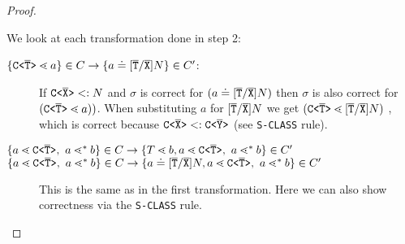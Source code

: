 \begin{proof}
\begin{description}
We look at each transformation done in step 2:
\begin{description}
\item[$\{ \mathtt{C \texttt{<} \overline{\tt T} \texttt{>} } \lessdot a \} \in C \to \{ a \doteq [\overline{\tt T}/\overline{\tt X}]N \} \in C'$:]
If $\mathtt{C \texttt{<} \overline{\tt X} \texttt{>} } <: N$ and $\sigma$ is correct for $(a \doteq [\overline{\tt T}/\overline{\tt X}]N)$
then $\sigma$ is also correct for $(\mathtt{C \texttt{<} \overline{\tt T} \texttt{>} } \lessdot a))$.
When substituting $a$ for $[\overline{\tt T}/\overline{\tt X}]N$ we get 
$(\mathtt{C \texttt{<} \overline{\tt T} \texttt{>} } \lessdot [\overline{\tt T}/\overline{\tt X}]N)$
, which is correct because $\mathtt{C \texttt{<} \overline{\tt X} \texttt{>} } <: \mathtt{C \texttt{<} \overline{\tt Y} \texttt{>} }$
(see \texttt{S-CLASS} rule).
\item[$\{ a \lessdot \mathtt{C \texttt{<} \overline{T} \texttt{>} },\ a \lessdot^* b \} \in C \to \{ T \lessdot b, a \lessdot \mathtt{C \texttt{<} \overline{T} \texttt{>} },\ a \lessdot^* b \} \in C'$]
\item[$\{ a \lessdot \mathtt{C \texttt{<} \overline{T} \texttt{>} },\ a \lessdot^* b \} \in C \to \{ a \doteq [\overline{\tt T}/\overline{\tt X}]N, a \lessdot \mathtt{C \texttt{<} \overline{T} \texttt{>} },\ a \lessdot^* b \} \in C'$]
This is the same as in the first transformation.
Here we can also show correctness via the \texttt{S-CLASS} rule.

\end{description}


\end{description}
\end{proof}
